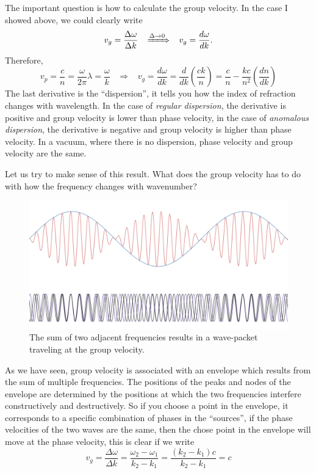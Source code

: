 The important question is how to calculate the group velocity. In the case I showed above, we could clearly write
\begin{equation}
    v_g=\frac{\Delta\omega}{\Delta k}\;\;\;\xRightarrow{\Delta\rightarrow 0}\;\;\;v_g=\frac{d\omega}{dk}.
\end{equation}
Therefore,
\begin{equation}
    v_p=\frac{c}{n}=\frac{\omega}{2\pi}\lambda=\frac{\omega}{k}\;\;\;\Rightarrow\;\;\; v_g=\frac{d\omega}{dk}=\frac{d}{dk}\left(\frac{ck}{n}\right)=\frac{c}{n}-\frac{kc}{n^2}\left(\frac{dn}{dk}\right)
\end{equation}
The last derivative is the ``dispersion'', it tells you how the index of refraction changes with wavelength. In the case of \textit{regular dispersion}, the derivative is positive and group velocity is lower than phase velocity, in the case of \textit{anomalous dispersion}, the derivative is negative and group velocity is higher than phase velocity. In a vacuum, where there is no dispersion, phase velocity and group velocity are the same.

Let us try to make sense of this result. What does the group velocity has to do with how the frequency changes with wavenumber?

\begin{figure}[h]
    \centering
    \includegraphics[width=\linewidth]{Figuras/group velocity sum.png}
    \caption{The sum of two adjacent frequencies results in a wave-packet traveling at the group velocity.}
    \label{fig:group.velocity.sum}
\end{figure}

As we have seen, group velocity is associated with an envelope which results from the sum of multiple frequencies. The positions of the peaks and nodes of the envelope are determined by the positions at which the two frequencies interfere constructively and destructively. So if you choose a point in the envelope, it corresponds to a specific combination of phases in the ``sources'', if the phase velocities of the two waves are the same, then the chose point in the envelope will move at the phase velocity, this is clear if we write
\begin{equation}
    v_g=\frac{\Delta\omega}{\Delta k}=\frac{\omega_2-\omega_1}{k_2-k_1}=\frac{(k_2-k_1)c}{k_2-k_1}=c
\end{equation}

